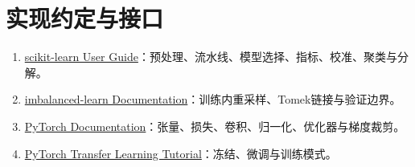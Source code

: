 \section*{实现约定与接口}
\begin{enumerate}
\item \href{https://scikit-learn.org/stable/user_guide.html}{scikit-learn User Guide}：预处理、流水线、模型选择、指标、校准、聚类与分解。
\item \href{https://imbalanced-learn.org/stable/}{imbalanced-learn Documentation}：训练内重采样、Tomek链接与验证边界。
\item \href{https://docs.pytorch.org/docs/stable/}{PyTorch Documentation}：张量、损失、卷积、归一化、优化器与梯度裁剪。
\item \href{https://docs.pytorch.org/tutorials/beginner/transfer_learning_tutorial.html}{PyTorch Transfer Learning Tutorial}：冻结、微调与训练模式。
\end{enumerate}

